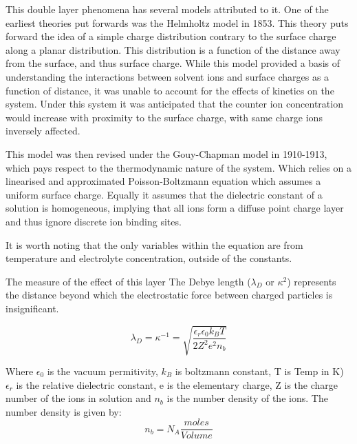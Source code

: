 This double layer phenomena has several models attributed to it. One of the earliest theories put forwards was the Helmholtz model in 1853. This theory puts forward the idea of a simple charge distribution contrary to the surface charge along a planar distribution. This distribution is a function of the distance away from the surface, and thus surface charge. While this model provided a basis of understanding the interactions between solvent ions and surface charges as a function of distance, it was unable to account for the effects of kinetics on the system. Under this system it was anticipated that the counter ion concentration would increase with proximity to the surface charge, with same charge ions inversely affected.

This model was then revised under the Gouy-Chapman model in 1910-1913, \cite{34} which pays respect to the thermodynamic nature of the system. Which relies on a linearised and approximated Poisson-Boltzmann equation %
which assumes a uniform surface charge. Equally it assumes that the dielectric constant of a solution is homogeneous, implying that all ions form a diffuse point charge layer and thus ignore discrete ion binding sites. 

It is worth noting that the only variables within the equation are from temperature and electrolyte concentration, outside of the constants.

The measure of the effect of this layer The Debye length ($\lambda_D$ or $\kappa^2$) represents the distance beyond which the electrostatic force between charged particles is insignificant.

\begin{equation}
\lambda_D = \kappa^{-1} = \sqrt{ \frac{ \epsilon_r \epsilon_0 k_B T}{2Z^2 e^2 n_b}}
\end{equation}

Where $\epsilon_0$ is the vacuum permitivity, $k_B$ is boltzmann constant, T is  Temp in K) 
$\epsilon_r$ is the relative dielectric constant, e is the elementary charge, Z is the charge number of the ions in solution and $n_b$ is the number density of the ions. %
The number density is given by:
\begin{equation}
n_b = N_A \frac{moles} {Volume}
\end{equation}

